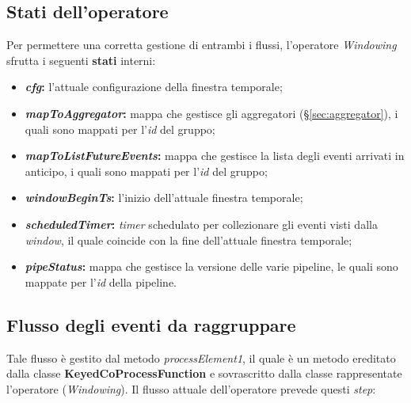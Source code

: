 \subsection{Stati dell'operatore}\label{sec:stati-windowing}
Per permettere una corretta gestione di entrambi i flussi, l'operatore \textit{Windowing} sfrutta i seguenti \textbf{stati} interni:
\begin{itemize}
		\item{\textbf{\textit{cfg}:} l'attuale configurazione della finestra temporale;}
		\item{\textbf{\textit{mapToAggregator}:} mappa che gestisce gli aggregatori (\S\ref{sec:aggregator}), i quali sono mappati per l'\textit{id} del gruppo;}
		\item{\textbf{\textit{mapToListFutureEvents}:} mappa che gestisce la lista degli eventi arrivati in anticipo, i quali sono mappati per l'\textit{id} del gruppo;}
		\item{\textbf{\textit{windowBeginTs}:} l'inizio dell'attuale finestra temporale;}
		\item{\textbf{\textit{scheduledTimer}:} \textit{timer} schedulato per collezionare gli eventi visti dalla \textit{window}, il quale coincide con la fine dell'attuale finestra temporale;}
		\item{\textbf{\textit{pipeStatus}:} mappa che gestisce la versione delle varie \gls{pipeline}, le quali sono mappate per l'\textit{id} della \gls{pipeline}.}
\end{itemize}


\subsection{Flusso degli eventi da raggruppare}\label{sec:pr1-windowing}
Tale flusso è gestito dal metodo \textit{processElement1}, il quale è un metodo ereditato dalla classe \textbf{KeyedCoProcessFunction} e sovrascritto dalla classe rappresentate l'operatore (\textit{Windowing}). Il flusso attuale dell'operatore prevede questi \textit{step}:

